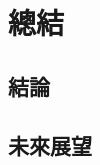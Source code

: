 \documentclass[class=NCU_thesis, crop=false]{standalone}
\begin{document}
\chapter{總結}
\section{結論}

\section{未來展望}
\end{document}
